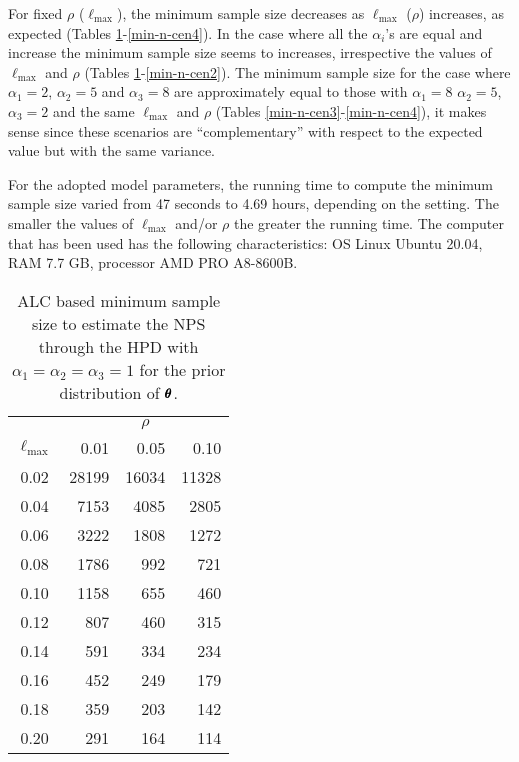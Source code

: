 \documentclass[12pt,a4paper]{article}%
\newcommand*{\bff}[1]{\ifmmode\pmb{#1}\else\textbf{#1}\fi}
\begin{document}
For fixed $\rho$ ($\ell_{\text{max}}$), the minimum sample size decreases as $\ell_{\text{max}}$ ($\rho$) increases, as expected (Tables \ref{min-n-cen1}-\ref{min-n-cen4}). In the case where all the $\alpha_i$'s are equal and increase the minimum sample size seems to increases, irrespective the values of $\ell_{\text{max}}$ and $\rho$ (Tables \ref{min-n-cen1}-\ref{min-n-cen2}). The minimum sample size for the case where $\alpha_1=2$, $\alpha_2=5$ and $\alpha_3=8$ are approximately equal to those with $\alpha_1=8$ $\alpha_2=5$, $\alpha_3=2$ and the same $\ell_{\text{max}}$ and $\rho$ (Tables \ref{min-n-cen3}-\ref{min-n-cen4}), it makes sense since these scenarios are ``complementary'' with respect to the expected value but with the same variance.

For the adopted model parameters, the running time to compute the minimum sample size varied from 47 seconds to 4.69 hours, depending on the setting. The smaller the values of $\ell_{\text{max}}$ and/or $\rho$ the greater the running time. The computer that has been used has the following characteristics: OS Linux Ubuntu 20.04, RAM 7.7 GB, processor AMD PRO A8-8600B.

\begin{table}
\begin{center}
\caption{ALC based minimum sample size to estimate the NPS through the HPD with $\alpha_1=\alpha_2=\alpha_3=1$ for the prior distribution of $\bff{\theta}$.}\label{min-n-cen1}
\begin{tabular}{crrr}
\hline
 & \multicolumn{3}{c}{$\rho$} \\\cline{2-4}
$\ell_{\text{max}}$ & 0.01 & 0.05 & 0.10\\\hline
0.02 & 28199 & 16034 & 11328\\
0.04 & 7153  & 4085  & 2805 \\
0.06 & 3222  & 1808  & 1272 \\
0.08 & 1786  & 992   & 721  \\
0.10 & 1158  & 655   & 460  \\
0.12 & 807   & 460   & 315  \\
0.14 & 591   & 334   & 234  \\
0.16 & 452   & 249   & 179  \\
0.18 & 359   & 203   & 142  \\
0.20 & 291   & 164   & 114  \\
\hline
\end{tabular}
\end{center}
\end{table}
\end{document}
